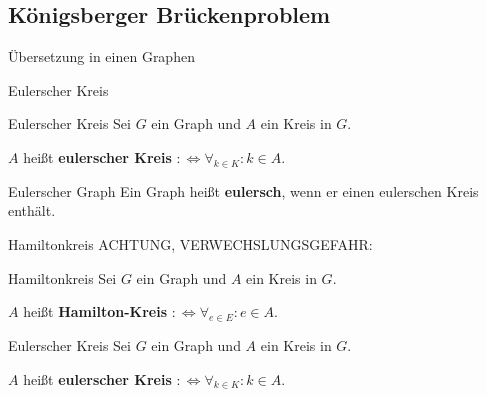 \subsection{Königsberger Brückenproblem}




\begin{frame}{Übersetzung in einen Graphen}
\begin{center}
\end{center}
\end{frame}

\begin{frame}{Eulerscher Kreis}
\begin{block}{Eulerscher Kreis}
Sei $G$ ein Graph und $A$ ein Kreis in $G$.

$A$ heißt \textbf{eulerscher Kreis} $:\Leftrightarrow \forall_{k \in K}: k \in A$.
\end{block}

\begin{block}{Eulerscher Graph}
Ein Graph heißt \textbf{eulersch}, wenn er einen eulerschen Kreis enthält.
\end{block}
\end{frame}

\begin{frame}{Hamiltonkreis}
ACHTUNG, VERWECHSLUNGSGEFAHR:

\begin{block}{Hamiltonkreis}
Sei $G$ ein Graph und $A$ ein Kreis in $G$.

$A$ heißt \textbf{Hamilton-Kreis} $:\Leftrightarrow \forall_{e \in E}: e \in A$.
\end{block}

\begin{block}{Eulerscher Kreis}
Sei $G$ ein Graph und $A$ ein Kreis in $G$.

$A$ heißt \textbf{eulerscher Kreis} $:\Leftrightarrow \forall_{k \in K}: k \in A$.
\end{block}
\end{frame}

